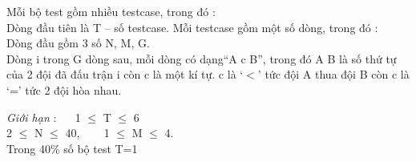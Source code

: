 Mỗi bộ test gồm nhiều testcase, trong đó :   \textbf{
\\}   Dòng đầu tiên là T – số testcase. Mỗi testcase gồm một số dòng, trong đó :   
\\   Dòng đầu gồm 3 số N, M, G.   
\\   Dòng i trong G dòng sau, mỗi dòng có dạng“A c B”, trong đó A B là số thứ tự của 2 đội đã đấu trận i còn c là một kí tự. c là ‘$<$’ tức đội A thua đội B còn c là ‘=’ tức 2 đội hòa nhau.  

\emph{    Giới hạn   }   :    1 $\le$  T  $\le$  6   
\\   2  $\le$  N  $\le$  40,     1  $\le$  M  $\le$  4.   
\\   Trong 40\% số bộ test T=1  

\